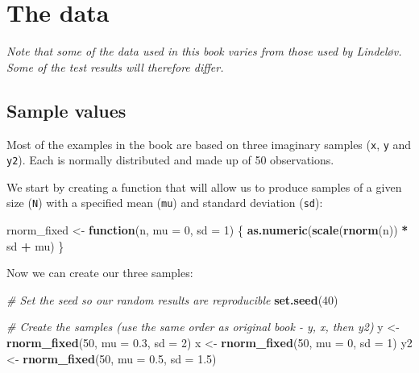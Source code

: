 \documentclass[
  12pt,
]{krantz}
\newenvironment{Shaded}{\begin{snugshade}}{\end{snugshade}}
\newcommand{\CommentTok}[1]{\textcolor[rgb]{0.56,0.35,0.01}{\textit{#1}}}
\newcommand{\ControlFlowTok}[1]{\textcolor[rgb]{0.13,0.29,0.53}{\textbf{#1}}}
\newcommand{\DataTypeTok}[1]{\textcolor[rgb]{0.13,0.29,0.53}{#1}}
\newcommand{\DecValTok}[1]{\textcolor[rgb]{0.00,0.00,0.81}{#1}}
\newcommand{\FloatTok}[1]{\textcolor[rgb]{0.00,0.00,0.81}{#1}}
\newcommand{\KeywordTok}[1]{\textcolor[rgb]{0.13,0.29,0.53}{\textbf{#1}}}
\newcommand{\NormalTok}[1]{#1}
\newcommand{\OperatorTok}[1]{\textcolor[rgb]{0.81,0.36,0.00}{\textbf{#1}}}
\newcommand{\StringTok}[1]{\textcolor[rgb]{0.31,0.60,0.02}{#1}}
\begin{document}
\hypertarget{data}{%
\chapter{The data}\label{data}}

\emph{Note that some of the data used in this book varies from those used by Lindeløv. Some of the test results will therefore differ.}

\hypertarget{samplevalues}{%
\section{Sample values}\label{samplevalues}}

Most of the examples in the book are based on three imaginary samples (\texttt{x}, \texttt{y} and \texttt{y2}). Each is normally distributed and made up of 50 observations.

We start by creating a function that will allow us to produce samples of a given size (\texttt{N}) with a specified mean (\texttt{mu}) and standard deviation (\texttt{sd}):

\begin{Shaded}
\begin{Highlighting}[]
\NormalTok{rnorm\_fixed \textless{}{-}}\StringTok{ }\ControlFlowTok{function}\NormalTok{(n, }\DataTypeTok{mu =} \DecValTok{0}\NormalTok{, }\DataTypeTok{sd =} \DecValTok{1}\NormalTok{) \{}
  \KeywordTok{as.numeric}\NormalTok{(}\KeywordTok{scale}\NormalTok{(}\KeywordTok{rnorm}\NormalTok{(n)) }\OperatorTok{*}\StringTok{ }\NormalTok{sd }\OperatorTok{+}\StringTok{ }\NormalTok{mu)}
\NormalTok{\}}
\end{Highlighting}
\end{Shaded}

Now we can create our three samples:

\begin{Shaded}
\begin{Highlighting}[]
\CommentTok{\# Set the seed so our \textquotesingle{}random\textquotesingle{} results are reproducible}
\KeywordTok{set.seed}\NormalTok{(}\DecValTok{40}\NormalTok{)}

\CommentTok{\# Create the samples (use the same order as original book {-} y, x, then y2)}
\NormalTok{y \textless{}{-}}\StringTok{ }\KeywordTok{rnorm\_fixed}\NormalTok{(}\DecValTok{50}\NormalTok{, }\DataTypeTok{mu =} \FloatTok{0.3}\NormalTok{, }\DataTypeTok{sd =} \DecValTok{2}\NormalTok{)}
\NormalTok{x \textless{}{-}}\StringTok{ }\KeywordTok{rnorm\_fixed}\NormalTok{(}\DecValTok{50}\NormalTok{, }\DataTypeTok{mu =} \DecValTok{0}\NormalTok{, }\DataTypeTok{sd =} \DecValTok{1}\NormalTok{)}
\NormalTok{y2 \textless{}{-}}\StringTok{ }\KeywordTok{rnorm\_fixed}\NormalTok{(}\DecValTok{50}\NormalTok{, }\DataTypeTok{mu =} \FloatTok{0.5}\NormalTok{, }\DataTypeTok{sd =} \FloatTok{1.5}\NormalTok{)}
\end{Highlighting}
\end{Shaded}
\end{document}
